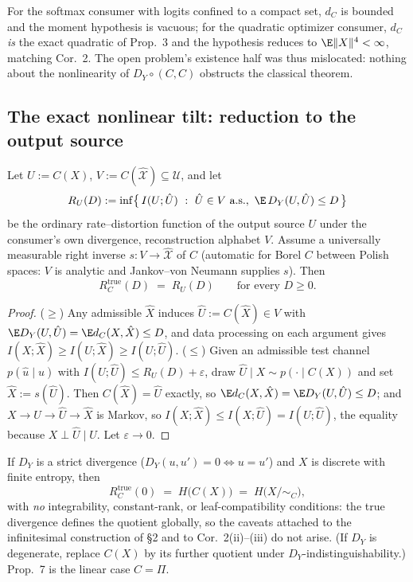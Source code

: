 \begin{remark}
For the softmax consumer with logits confined to a compact set, $d_C$ is
bounded and the moment hypothesis is vacuous; for the quadratic optimizer
consumer, $d_C$ \emph{is} the exact quadratic of Prop.~3 and the hypothesis
reduces to $\E\|X\|^4<\infty$, matching Cor.~2. The open problem's existence
half was thus mislocated: nothing about the nonlinearity of $D_Y\circ(C,C)$
obstructs the classical theorem.
\end{remark}

\subsection{The exact nonlinear tilt: reduction to the output source}

\begin{theorem}
\label{thm:B2}
Let $U:=C(X)$, $V:=C(\hat{\mathcal{X}})\subseteq\mathcal{U}$, and let
\[
R_U(D) := \inf\bigl\{\, I(U;\hat U)\ :\ \hat U\in V\ \text{a.s.},\
\E\, D_Y(U,\hat U)\le D \,\bigr\}
\]
be the ordinary rate--distortion function of the output source $U$ under the
consumer's own divergence, reconstruction alphabet $V$. Assume a universally
measurable right inverse $s:V\to\hat{\mathcal{X}}$ of $C$ (automatic for Borel
$C$ between Polish spaces: $V$ is analytic and Jankov--von Neumann supplies
$s$). Then
\[
R_C^{\mathrm{true}}(D) \;=\; R_U(D) \qquad\text{for every } D\ge 0.
\]
\end{theorem}

\begin{proof}
($\ge$) Any admissible $\hat X$ induces $\hat U:=C(\hat X)\in V$ with
$\E D_Y(U,\hat U)=\E d_C(X,\hat X)\le D$, and data processing on each argument
gives $I(X;\hat X)\ge I(U;\hat X)\ge I(U;\hat U)$.
($\le$) Given an admissible test channel $p(\hat u\mid u)$ with
$I(U;\hat U)\le R_U(D)+\varepsilon$, draw $\hat U\mid X\sim p(\cdot\mid C(X))$
and set $\hat X:=s(\hat U)$. Then $C(\hat X)=\hat U$ exactly, so
$\E d_C(X,\hat X)=\E D_Y(U,\hat U)\le D$; and $X\to U\to\hat U\to\hat X$ is
Markov, so $I(X;\hat X)\le I(X;\hat U)=I(U;\hat U)$, the equality because
$X\perp\hat U\mid U$. Let $\varepsilon\to0$.
\end{proof}

\begin{corollary}
\label{cor:B2a}
If $D_Y$ is a strict divergence ($D_Y(u,u')=0\iff u=u'$) and $X$ is discrete
with finite entropy, then
\[
R_C^{\mathrm{true}}(0)\;=\;H\bigl(C(X)\bigr)\;=\;H\bigl(X/\!\sim_C\bigr),
\]
with \emph{no} integrability, constant-rank, or leaf-compatibility conditions:
the true divergence defines the quotient globally, so the caveats attached to
the infinitesimal construction of \S2 and to Cor.~2(ii)--(iii) do not arise.
(If $D_Y$ is degenerate, replace $C(X)$ by its further quotient under
$D_Y$-indistinguishability.) Prop.~7 is the linear case $C=\Pi$.
\end{corollary}

